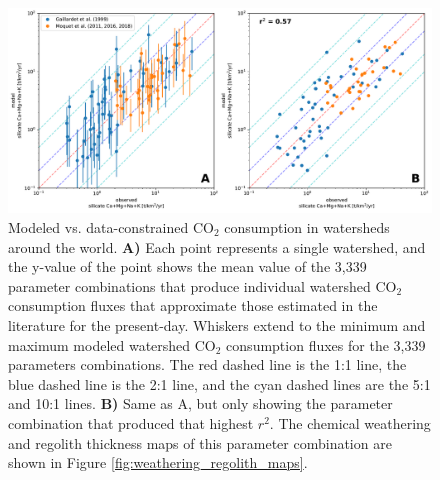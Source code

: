 \documentclass[11pt,letterpaper]{article}
\newcommand{\COtwo}{CO$_{2}$\xspace}
\begin{document}
\begin{figure}[h!]
    \centering
    \includegraphics[width=1\textwidth]{Manuscript/Figures/r2_cross_plot.pdf}
    \caption{Modeled vs. data-constrained \COtwo consumption in watersheds around the world. \textbf{A)} Each point represents a single watershed, and the y-value of the point shows the mean value of the 3,339 parameter combinations that produce individual watershed \COtwo consumption fluxes that approximate those estimated in the literature for the present-day. Whiskers extend to the minimum and maximum modeled watershed \COtwo consumption fluxes for the 3,339 parameters combinations. The red dashed line is the 1:1 line, the blue dashed line is the 2:1 line, and the cyan dashed lines are the 5:1 and 10:1 lines. \textbf{B)} Same as A, but only showing the parameter combination that produced that highest $r^{2}$. The chemical weathering and regolith thickness maps of this parameter combination are shown in Figure \ref{fig:weathering_regolith_maps}.}
    \label{fig:r2_cross_plot}
\end{figure}
\end{document}
